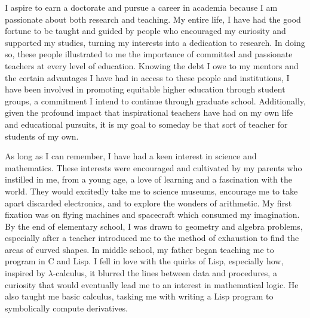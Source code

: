 \documentclass[11pt]{article}
\begin{document}
I aspire to earn a doctorate and pursue a career in academia because I am passionate about both research and teaching. My entire life, I have had the good fortune to be taught and guided by people who encouraged my curiosity and supported my studies, turning my interests into a dedication to research. In doing so, these people illustrated to me the importance of committed and passionate teachers at every level of education. Knowing the debt I owe to my mentors and the certain advantages I have had in access to these people and institutions, I have been involved in promoting equitable higher education through student groups, a commitment I intend to continue through graduate school. Additionally, given the profound impact that inspirational teachers have had on my own life and educational pursuits, it is my goal to someday be that sort of teacher for students of my own. 
\par
As long as I can remember, I have had a keen interest in science and mathematics. These interests were encouraged and cultivated by my parents who instilled in me, from a young age, a love of learning and a fascination with the world. They would excitedly take me to science museums, encourage me to take apart discarded electronics, and to explore the wonders of arithmetic. My first fixation was on flying machines and spacecraft which consumed my imagination. By the end of elementary school, I was drawn to geometry and algebra problems, especially after a teacher introduced me to the method of exhaustion to find the areas of curved shapes. In middle school, my father began teaching me to program in C and Lisp. I fell in love with the quirks of Lisp, especially how, inspired by $\lambda$-calculus, it blurred the lines between data and procedures, a curiosity that would eventually lead me to an interest in mathematical logic. He also taught me basic calculus, tasking me with writing a Lisp program to symbolically compute derivatives.
\par
\end{document}
